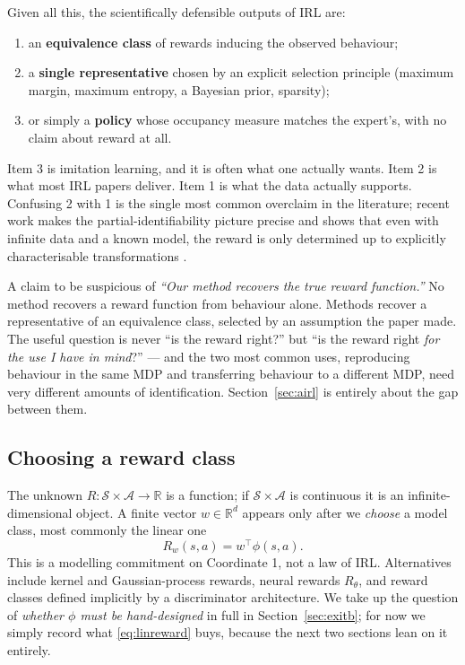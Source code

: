 \documentclass[11pt]{article}
\theoremstyle{plain}
\theoremstyle{definition}
\theoremstyle{remark}
\renewcommand{\S}{\mathcal{S}}
\newcommand{\A}{\mathcal{A}}
\newcommand{\R}{\mathbb{R}}
\begin{document}
Given all this, the scientifically defensible outputs of IRL are:
\begin{enumerate}
\item an \textbf{equivalence class} of rewards inducing the observed
behaviour;
\item a \textbf{single representative} chosen by an explicit selection
principle (maximum margin, maximum entropy, a Bayesian prior, sparsity);
\item or simply a \textbf{policy} whose occupancy measure matches the
expert's, with no claim about reward at all.
\end{enumerate}

Item 3 is imitation learning, and it is often what one actually wants.
Item 2 is what most IRL papers deliver. Item 1 is what the data actually
supports. Confusing 2 with 1 is the single most common overclaim in the
literature; recent work makes the partial-identifiability picture precise
and shows that even with infinite data and a known model, the reward is
only determined up to explicitly characterisable transformations
\cite{cao2021,skalse2023}.

\begin{redbox}{A claim to be suspicious of}
\emph{``Our method recovers the true reward function.''} No method
recovers a reward function from behaviour alone. Methods recover a
representative of an equivalence class, selected by an assumption the
paper made. The useful question is never ``is the reward right?'' but ``is
the reward right \emph{for the use I have in mind}?'' --- and the two most
common uses, reproducing behaviour in the same MDP and transferring
behaviour to a different MDP, need very different amounts of
identification. Section~\ref{sec:airl} is entirely about the gap between
them.
\end{redbox}

\subsection{Choosing a reward class}

The unknown $R:\S\times\A\to\R$ is a function; if $\S\times\A$ is
continuous it is an infinite-dimensional object. A finite vector $w\in
\R^d$ appears only after we \emph{choose} a model class, most commonly the
linear one
\begin{equation}
R_w(s,a) = w^\top \phi(s,a).
\label{eq:linreward}
\end{equation}
This is a modelling commitment on Coordinate 1, not a law of IRL.
Alternatives include kernel and Gaussian-process rewards, neural rewards
$R_\theta$, and reward classes defined implicitly by a discriminator
architecture. We take up the question of \emph{whether $\phi$ must be
hand-designed} in full in Section~\ref{sec:exitb}; for now we simply
record what \eqref{eq:linreward} buys, because the next two sections lean
on it entirely.
\end{document}
